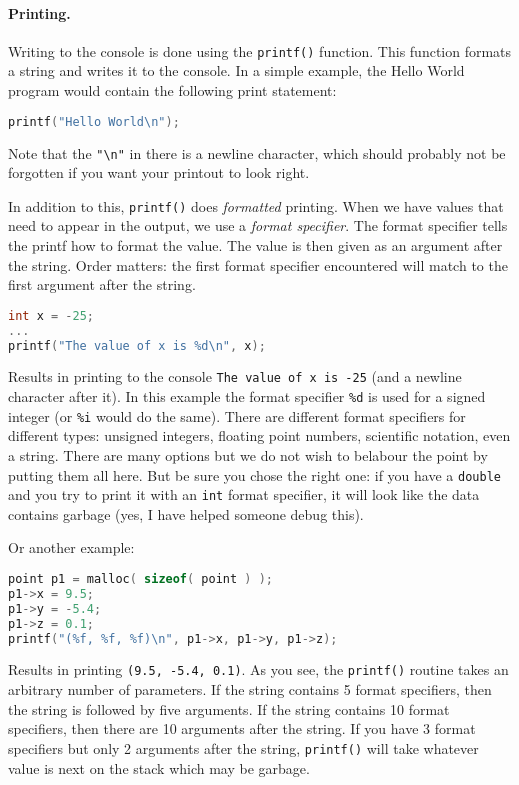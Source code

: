 \paragraph{Printing.}

Writing to the console is done using the \texttt{printf()} function. This function formats a string and writes it to the console. In a simple example, the Hello World program would contain the following print statement:

\begin{lstlisting}[language=C]
printf("Hello World\n");
\end{lstlisting}

Note that the \texttt{"\textbackslash n"} in there is a newline character, which should probably not be forgotten if you want your printout to look right.

In addition to this, \texttt{printf()} does \textit{formatted} printing. When we have values that need to appear in the output, we use a \textit{format specifier}. The format specifier tells the printf how to format the value. The value is then given as an argument after the string. Order matters: the first format specifier encountered will match to the first argument after the string.

\begin{lstlisting}[language=C]
int x = -25;
...
printf("The value of x is %d\n", x);
\end{lstlisting}

Results in printing to the console \texttt{The value of x is -25} (and a newline character after it). In this example the format specifier \texttt{\%d} is used for a signed integer (or \texttt{\%i} would do the same). There are different format specifiers for different types: unsigned integers, floating point numbers, scientific notation, even a string. There are many options but we do not wish to belabour the point by putting them all here. But be sure you chose the right one: if you have a \texttt{double} and you try to print it with an \texttt{int} format specifier, it will look like the data contains garbage (yes, I have helped someone debug this).

Or another example:
\begin{lstlisting}[language=C]
point p1 = malloc( sizeof( point ) );
p1->x = 9.5;
p1->y = -5.4;
p1->z = 0.1;
printf("(%f, %f, %f)\n", p1->x, p1->y, p1->z);
\end{lstlisting}

Results in printing \texttt{(9.5, -5.4, 0.1)}. As you see, the \texttt{printf()} routine takes an arbitrary number of parameters. If the string contains 5 format specifiers, then the string is followed by five arguments. If the string contains 10 format specifiers, then there are 10 arguments after the string. If you have 3 format specifiers but only 2 arguments after the string, \texttt{printf()} will take whatever value is next on the stack which may be garbage.

